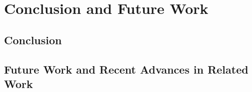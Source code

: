 \chapter{Conclusion and Future Work} \label{sec:chapter5}

\section{Conclusion}

\section{Future Work and Recent Advances in Related Work}
